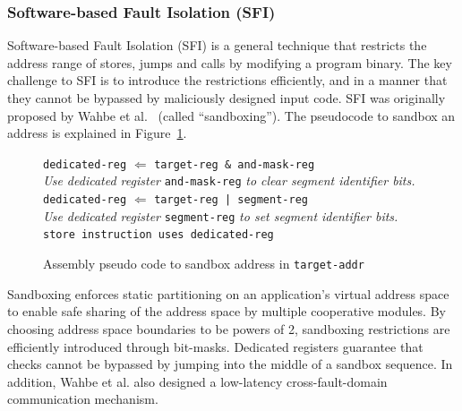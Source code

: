 \subsubsection{Software-based Fault Isolation (SFI)}
%
Software-based Fault Isolation (SFI) is a general technique that
restricts the address range of stores, jumps and calls by modifying a
program binary.
%
The key challenge to SFI is to introduce the restrictions efficiently, and in
a manner that they cannot be bypassed by maliciously designed input
code.
%
SFI was originally proposed by Wahbe et al.~\cite{wahbe93sfi} (called
``sandboxing'').
%
The pseudocode to sandbox an address is explained in
Figure~\ref{fig:sbxpseudocode}.
%

\begin{figure}
 \begin{tabbing}
  \texttt{dedi}\=\texttt{cated-reg} $\Leftarrow$ \texttt{target-reg \&
    and-mask-reg} \\
  \>\emph{Use dedicated register} \texttt{and-mask-reg} \emph{to clear
    segment identifier bits.}\\
  \texttt{dedicated-reg} $\Leftarrow$ \texttt{target-reg |
    segment-reg} \\
  \>\emph{Use dedicated register} \texttt{segment-reg} \emph{to set
    segment identifier bits.}\\
  \texttt{store instruction uses dedicated-reg}
 \end{tabbing}
 \caption{Assembly pseudo code to sandbox address in
   \texttt{target-addr}}
 \label{fig:sbxpseudocode}
\end{figure}
%

Sandboxing enforces static partitioning on an application's virtual address
space to enable safe sharing of the address space by multiple
cooperative modules.
%
By choosing address space boundaries to be powers of 2, sandboxing
restrictions are efficiently introduced through bit-masks.
%
%
Dedicated registers guarantee that checks cannot be bypassed by
jumping into the middle of a sandbox sequence.
%
In addition, Wahbe et al. also designed a low-latency
cross-fault-domain communication mechanism.
%

